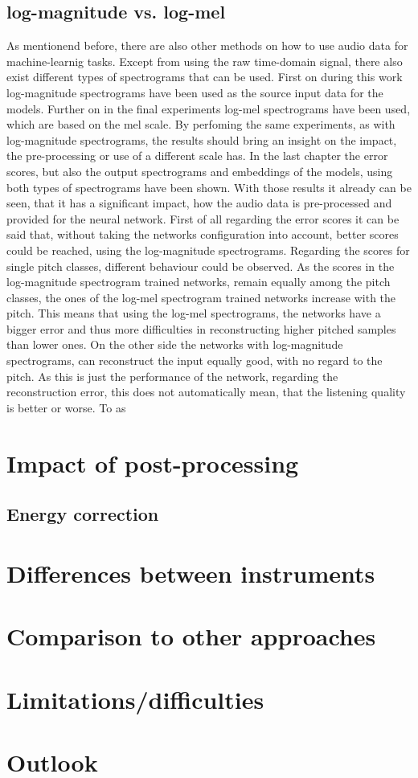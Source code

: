 \subsection{log-magnitude vs. log-mel}
As mentionend before, there are also other methods on how to use audio data for machine-learnig tasks. Except from using the raw time-domain signal, there also exist different types of spectrograms that can be used. First on during this work log-magnitude spectrograms have been used as the source input data for the models. Further on in the final experiments log-mel spectrograms have been used, which are based on the mel scale. By perfoming the same experiments, as with log-magnitude spectrograms, the results should bring an insight on the impact, the pre-processing or use of a different scale has. In the last chapter the error scores, but also the output spectrograms and embeddings of the models, using both types of spectrograms have been shown. With those results it already can be seen, that it has a significant impact, how the audio data is pre-processed and provided for the neural network. First of all regarding the error scores it can be said that, without taking the networks configuration into account, better scores could be reached, using the log-magnitude spectrograms. Regarding the scores for single pitch classes, different behaviour could be observed. As the scores in the log-magnitude spectrogram trained networks, remain equally among the pitch classes, the ones of the log-mel spectrogram trained networks increase with the pitch. This means that using the log-mel spectrograms, the networks have a bigger error and thus more difficulties in reconstructing higher pitched samples than lower ones. On the other side the networks with log-magnitude spectrograms, can reconstruct the input equally good, with no regard to the pitch. As this is just the performance of the network, regarding the reconstruction error, this does not automatically mean, that the listening quality is better or worse. To as



\section{Impact of post-processing}

\subsection{Energy correction}

\section{Differences between instruments}

\section{Comparison to other approaches}

\section{Limitations/difficulties}


\section{Outlook}


